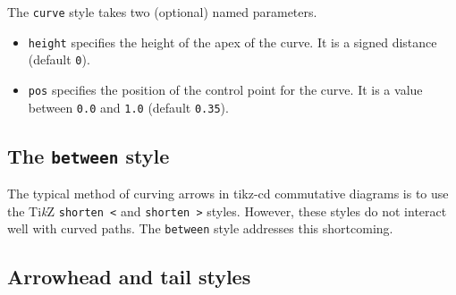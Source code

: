 \documentclass[12pt,a4paper]{article}
\newcommand{\tcd}{\textsf{tikz-cd}}
\newcommand{\TikZ}{{\rm Ti{\it k}Z}}
\begin{document}
The \texttt{curve} style takes two (optional) named parameters.

\begin{itemize}
    \item \texttt{height} specifies the height of the apex of the curve. It is a signed distance (default \texttt{0}).
    \item \texttt{pos} specifies the position of the control point for the curve. It is a value between \texttt{0.0} and \texttt{1.0} (default \texttt{0.35}).
\end{itemize}

\begin{tikzexample}
\end{tikzexample}

\begin{tikzexample}
\end{tikzexample}

\begin{tikzexample}
\end{tikzexample}

\subsection{The \texttt{between} style}

The typical method of curving arrows in \tcd{} commutative diagrams is to use the \TikZ{} \texttt{shorten <} and \texttt{shorten >} styles. However, these styles do not interact well with curved paths. The \texttt{between} style addresses this shortcoming.

\begin{tikzexample}
\end{tikzexample}

\subsection{Arrowhead and tail styles}
\end{document}
